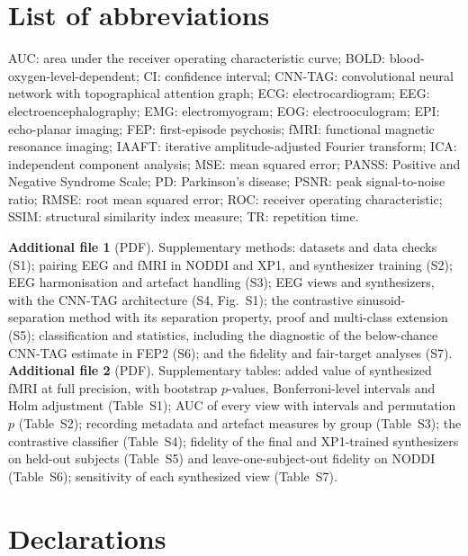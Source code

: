 \documentclass[pdflatex,referee,sn-basic]{sn-jnl}%
\begin{document}
\section*{List of abbreviations}
AUC: area under the receiver operating characteristic curve; BOLD: blood-oxygen-level-dependent; CI: confidence interval; CNN-TAG: convolutional neural network with topographical attention graph; ECG: electrocardiogram; EEG: electroencephalography; EMG: electromyogram; EOG: electrooculogram; EPI: echo-planar imaging; FEP: first-episode psychosis; fMRI: functional magnetic resonance imaging; IAAFT: iterative amplitude-adjusted Fourier transform; ICA: independent component analysis; MSE: mean squared error; PANSS: Positive and Negative Syndrome Scale; PD: Parkinson's disease; PSNR: peak signal-to-noise ratio; RMSE: root mean squared error; ROC: receiver operating characteristic; SSIM: structural similarity index measure; TR: repetition time.

\backmatter

\textbf{Additional file 1} (PDF). Supplementary methods: datasets and data checks (S1); pairing EEG and fMRI in NODDI and XP1, and synthesizer training (S2); EEG harmonisation and artefact handling (S3); EEG views and synthesizers, with the CNN-TAG architecture (S4, Fig.~S1); the contrastive sinusoid-separation method with its separation property, proof and multi-class extension (S5); classification and statistics, including the diagnostic of the below-chance CNN-TAG estimate in FEP2 (S6); and the fidelity and fair-target analyses (S7). \textbf{Additional file 2} (PDF). Supplementary tables: added value of synthesized fMRI at full precision, with bootstrap $p$-values, Bonferroni-level intervals and Holm adjustment (Table~S1); AUC of every view with intervals and permutation $p$ (Table~S2); recording metadata and artefact measures by group (Table~S3); the contrastive classifier (Table~S4); fidelity of the final and XP1-trained synthesizers on held-out subjects (Table~S5) and leave-one-subject-out fidelity on NODDI (Table~S6); sensitivity of each synthesized view (Table~S7).

\section*{Declarations}
\end{document}
